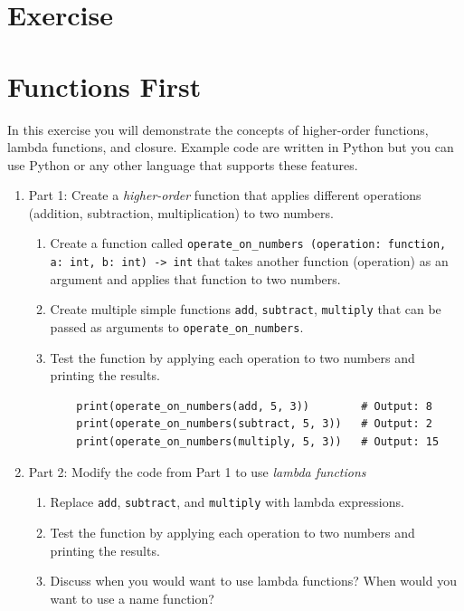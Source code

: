 \documentclass[oneside,11pt,dvipsnames]{book}
\newcommand{\code}[1]{\texttt{#1}}
\begin{document}
\section{Exercise}

\section{Functions First}\label{exercise:functions-first}

In this exercise you will demonstrate the concepts of higher-order functions, lambda functions, and closure. Example code are written in Python but you can use Python or any other language that supports these features.

\begin{enumerate}
\item Part 1: Create a \emph{higher-order} function that applies different operations (addition, subtraction, multiplication) to two numbers.
\begin{enumerate}
\item Create a function called \code{operate\_on\_numbers (operation: function, a: int, b: int) -> int} that takes another function (operation) as an argument and applies that function to two numbers.
\item Create multiple simple functions \code{add}, \code{subtract}, \code{multiply} that can be passed as arguments to \code{operate\_on\_numbers}.
\item Test the function by applying each operation to two numbers and printing the results.
\begin{lstlisting}
    print(operate_on_numbers(add, 5, 3))        # Output: 8
    print(operate_on_numbers(subtract, 5, 3))   # Output: 2
    print(operate_on_numbers(multiply, 5, 3))   # Output: 15
\end{lstlisting}

\end{enumerate}

\item Part 2: Modify the code from Part 1 to use \emph{lambda functions} 
\begin{enumerate}
\item Replace \code{add}, \code{subtract}, and \code{multiply} with lambda expressions.
\item Test the function by applying each operation to two numbers and printing the results.
\item Discuss when you would want to use lambda functions? When would you want to use a name function?
\end{enumerate}


\end{enumerate}
\end{document}
